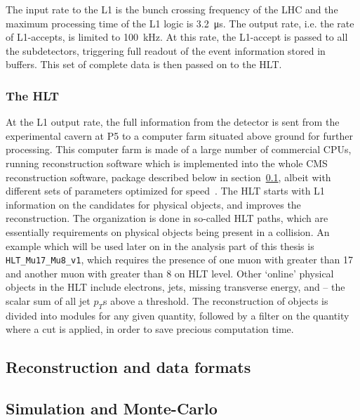 The input rate to the L1 is the bunch crossing frequency of the LHC and the maximum processing time of the L1 logic is \SI{3.2}{\micro\second}. The output rate, 
i.e. the rate of L1-accepts, is limited to \SI{100}{\kilo\hertz}. At this rate, the
L1-accept is passed to all the subdetectors, triggering full readout of the event information stored in buffers. This set of complete data is then passed on to the HLT.

\subsubsection*{The HLT}
At the L1 output rate, the full information from the detector is sent from the experimental cavern at P5 to a computer farm situated above ground for further processing.
This computer farm is made of a large number of commercial CPUs, running reconstruction software which is implemented into the whole CMS reconstruction software, package 
described below in section~\ref{sub:cms_reco}, albeit with different sets of parameters optimized for speed~\cite{hltcms}. The HLT starts with L1 information on the candidates for
physical objects, and improves the reconstruction. The organization is done in so-called HLT paths, which are essentially requirements on physical objects being present in
a collision. An example which will be used later on in the analysis part of this thesis is \texttt{HLT\_Mu17\_Mu8\_v1}, which requires the presence of one muon with \pt
greater than 17 \gev and another muon with \pt greater than 8 \gev on HLT level. Other `online' physical objects in the HLT include electrons, jets, missing transverse
energy, and \ht -- the scalar sum of all jet $p_T$s above a threshold. The reconstruction of objects is divided into modules for any given quantity, followed by a filter on 
the quantity where a cut is applied, in order to save precious computation time.



\subsection{Reconstruction and data formats}
\label{sub:cms_reco}
\subsection{Simulation and Monte-Carlo}
\label{sub:cms_mc}
